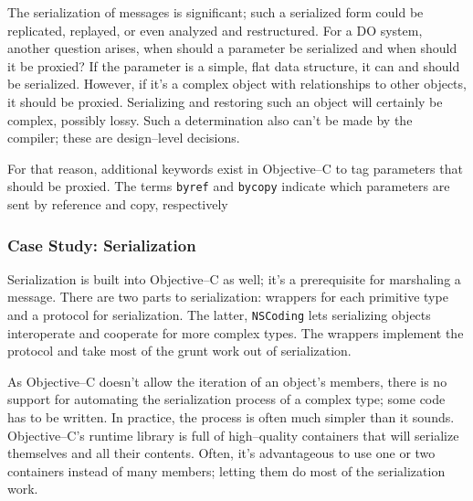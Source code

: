 	The serialization of messages is significant; such a serialized form could be replicated, replayed, or even analyzed and restructured.  For a DO system, another question arises, when should a parameter be serialized and when should it be proxied?  If the parameter is a simple, flat data structure, it can and should be serialized.  However, if it's a complex object with relationships to other objects, it should be proxied.  Serializing and restoring such an object will certainly be complex, possibly lossy.  Such a determination also can't be made by the compiler; these are design--level decisions.  

	For that reason, additional keywords exist in Objective--C to tag parameters that should be proxied.  The terms \texttt{byref} and \texttt{bycopy} indicate which parameters are sent by reference and copy, respectively

	\subsubsection{Case Study: Serialization}
	Serialization is built into Objective--C as well; it's a prerequisite for marshaling a message.  There are two parts to serialization: wrappers for each primitive type and a protocol for serialization.  The latter, \texttt{NSCoding} lets serializing objects interoperate and cooperate for more complex types.  The wrappers implement the protocol and take most of the grunt work out of serialization.  

	As Objective--C doesn't allow the iteration of an object's members, there is no support for automating the serialization process of a complex type; some code has to be written.  In practice, the process is often much simpler than it sounds.  Objective--C's runtime library is full of high--quality containers that will serialize themselves and all their contents.  Often, it's advantageous to use one or two containers instead of many members; letting them do most of the serialization work.

%
%
%
